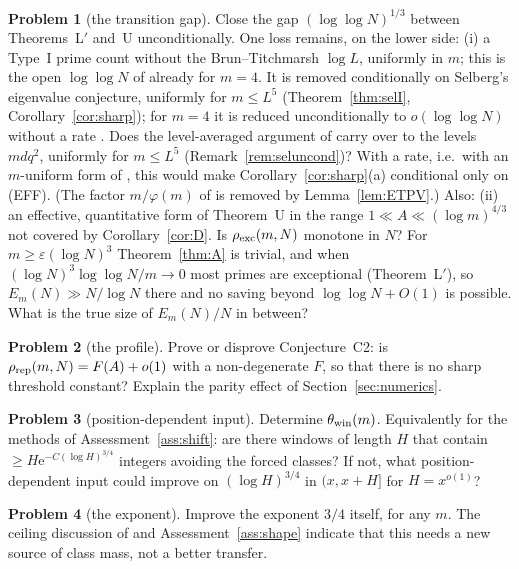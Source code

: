 \documentclass[10pt,reqno]{amsart}
\theoremstyle{definition}
\newtheorem{problem}{Problem}
\newcommand{\e}{\mathrm e}
\begin{document}
\begin{problem}[the transition gap]\label{prob:gap}
Close the gap $(\log\log N)^{1/3}$ between Theorems~L$'$ and~U
unconditionally.
One loss remains, on the lower side: (i) a Type~I prime count
without the Brun--Titchmarsh $\log L$, uniformly in $m$; this is the open
$\log\log N$ of \cite[Thm.~1.1]{ET} already for $m=4$.  It is removed
conditionally on Selberg's eigenvalue conjecture, uniformly for
$m\leq L^5$ (Theorem~\ref{thm:selI}, Corollary~\ref{cor:sharp}); for
$m=4$ it is reduced unconditionally to $o(\log\log N)$ without a rate
\cite[Thm.~1]{HN}.  Does the level-averaged argument of \cite[\S9]{HN}
carry over to the levels $mdq^2$, uniformly for $m\leq L^5$
(Remark~\ref{rem:seluncond})?  With a rate, i.e.\ with an
$m$-uniform form of \cite[Thm.~9.9(ii)]{HN}, this would make
Corollary~\ref{cor:sharp}(a) conditional only on (EFF).  (The factor
$m/\varphi(m)$ of \cite{MN2} is removed by Lemma~\ref{lem:ETPV}.)  Also: (ii) an effective, quantitative
form of Theorem~U in the range $1\ll A\ll(\log m)^{4/3}$ not covered by
Corollary~\ref{cor:D}.  Is $\rho_{\rm exc}(m,N)$ monotone in $N$?
For $m\geq\varepsilon(\log N)^3$ Theorem~\ref{thm:A} is trivial, and
when $(\log N)^3\log\log N/m\to0$ %
most primes are
exceptional (Theorem~L$'$), so $E_m(N)\gg N/\log N$ there and no saving beyond
$\log\log N+O(1)$ is possible.  What is the true size of $E_m(N)/N$ in
between?
\end{problem}

\begin{problem}[the profile]
Prove or disprove Conjecture~C2: is $\rho_{\rm rep}(m,N)=F(A)+o(1)$ with a
non-degenerate $F$, so that there is no sharp threshold constant?
Explain the parity effect of Section~\ref{sec:numerics}.
\end{problem}

\begin{problem}[position-dependent input]
Determine $\theta_{\rm win}(m)$.  Equivalently for the methods of
Assessment~\ref{ass:shift}: are there windows of length $H$ that contain
$\geq H\e^{-C(\log H)^{3/4}}$ integers avoiding the forced classes?  If
not, what position-dependent input could improve on $(\log H)^{3/4}$ in
$(x,x+H]$ for $H=x^{o(1)}$?
\end{problem}

\begin{problem}[the exponent]
Improve the exponent $3/4$ itself, for any $m$.  The ceiling discussion
of \cite[\S10]{TQ} and Assessment~\ref{ass:shape} indicate that this
needs a new source of class mass, not a better transfer.
\end{problem}
\end{document}
